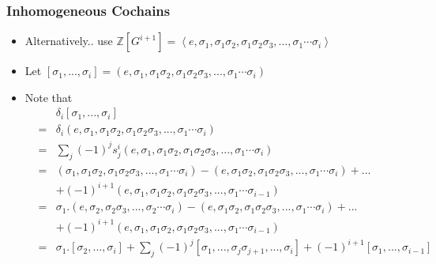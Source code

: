 \documentclass[10pt,xcolor=table,dvipsnames]{beamer}
\newenvironment{stepitemize}{\begin{itemize}[<+->]}{\end{itemize} }
\begin{document}
\begin{frame}
\frametitle{Inhomogeneous Cochains}
\begin{stepitemize}
\item[] Alternatively.. use $\mathbb{Z}\left[ G^{i+1}\right] =\left\langle e,\sigma
_{1},\sigma _{1}\sigma _{2},\sigma _{1}\sigma _{2}\sigma _{3},...,\sigma
_{1}\cdots \sigma _{i}\right\rangle $

\item[] Let $\left[ \sigma _{1},...,\sigma _{i}\right] =\left( e,\sigma _{1},\sigma
_{1}\sigma _{2},\sigma _{1}\sigma _{2}\sigma _{3},...,\sigma _{1}\cdots
\sigma _{i}\right) $

\item[] Note that
\begin{eqnarray*}
&&\delta _{i}\left[ \sigma _{1},...,\sigma _{i}\right]  \\
&=&\delta _{i}\left( e,\sigma _{1},\sigma _{1}\sigma _{2},\sigma _{1}\sigma
_{2}\sigma _{3},...,\sigma _{1}\cdots \sigma _{i}\right)  \\
&=&\sum\limits_{j}\left( -1\right) ^{j}s_{j}^{i}\left( e,\sigma _{1},\sigma
_{1}\sigma _{2},\sigma _{1}\sigma _{2}\sigma _{3},...,\sigma _{1}\cdots
\sigma _{i}\right)  \\
&=&\left( \sigma _{1},\sigma _{1}\sigma _{2},\sigma _{1}\sigma _{2}\sigma
_{3},...,\sigma _{1}\cdots \sigma _{i}\right) -\left( e,\sigma _{1}\sigma
_{2},\sigma _{1}\sigma _{2}\sigma _{3},...,\sigma _{1}\cdots \sigma
_{i}\right) +... \\
&&+\left( -1\right) ^{i+1}\left( e,\sigma _{1},\sigma _{1}\sigma _{2},\sigma
_{1}\sigma _{2}\sigma _{3},...,\sigma _{1}\cdots \sigma _{i-1}\right)  \\
&=&\sigma _{1}.\left( e,\sigma _{2},\sigma _{2}\sigma _{3},...,\sigma
_{2}\cdots \sigma _{i}\right) -\left( e,\sigma _{1}\sigma _{2},\sigma
_{1}\sigma _{2}\sigma _{3},...,\sigma _{1}\cdots \sigma _{i}\right) +... \\
&&+\left( -1\right) ^{i+1}\left( e,\sigma _{1},\sigma _{1}\sigma _{2},\sigma
_{1}\sigma _{2}\sigma _{3},...,\sigma _{1}\cdots \sigma _{i-1}\right)  \\
&=&\sigma _{1}.\left[ \sigma _{2},...,\sigma _{i}\right] +\sum\limits_{j}%
\left( -1\right) ^{j}\left[ \sigma _{1},...,\sigma _{j}\sigma
_{j+1},...,\sigma _{i}\right] +\left( -1\right) ^{i+1}\left[ \sigma
_{1},...,\sigma _{i-1}\right]
\end{eqnarray*}
\end{stepitemize}
\end{frame}
\end{document}
